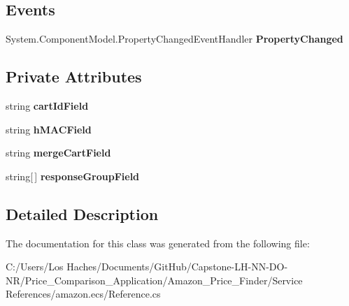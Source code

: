 \subsection*{Events}
\begin{DoxyCompactItemize}
\item 
\hypertarget{class_price___comparison_1_1amazon_1_1ecs_1_1_cart_clear_request_a8ccd384a0b7b5da722a6b6af9a76769d}{System.\-Component\-Model.\-Property\-Changed\-Event\-Handler {\bfseries Property\-Changed}}\label{class_price___comparison_1_1amazon_1_1ecs_1_1_cart_clear_request_a8ccd384a0b7b5da722a6b6af9a76769d}

\end{DoxyCompactItemize}
\subsection*{Private Attributes}
\begin{DoxyCompactItemize}
\item 
\hypertarget{class_price___comparison_1_1amazon_1_1ecs_1_1_cart_clear_request_a6cca7bbc7fdb17bf0630b02a17c46d0e}{string {\bfseries cart\-Id\-Field}}\label{class_price___comparison_1_1amazon_1_1ecs_1_1_cart_clear_request_a6cca7bbc7fdb17bf0630b02a17c46d0e}

\item 
\hypertarget{class_price___comparison_1_1amazon_1_1ecs_1_1_cart_clear_request_a2221df97dc1302f361955cd33f50a418}{string {\bfseries h\-M\-A\-C\-Field}}\label{class_price___comparison_1_1amazon_1_1ecs_1_1_cart_clear_request_a2221df97dc1302f361955cd33f50a418}

\item 
\hypertarget{class_price___comparison_1_1amazon_1_1ecs_1_1_cart_clear_request_aa51b51ce7e00940acfa16834db048952}{string {\bfseries merge\-Cart\-Field}}\label{class_price___comparison_1_1amazon_1_1ecs_1_1_cart_clear_request_aa51b51ce7e00940acfa16834db048952}

\item 
\hypertarget{class_price___comparison_1_1amazon_1_1ecs_1_1_cart_clear_request_aa4db9a69945bca2aa3376759f734f3d6}{string\mbox{[}$\,$\mbox{]} {\bfseries response\-Group\-Field}}\label{class_price___comparison_1_1amazon_1_1ecs_1_1_cart_clear_request_aa4db9a69945bca2aa3376759f734f3d6}

\end{DoxyCompactItemize}


\subsection{Detailed Description}


The documentation for this class was generated from the following file\-:\begin{DoxyCompactItemize}
\item 
C\-:/\-Users/\-Los Haches/\-Documents/\-Git\-Hub/\-Capstone-\/\-L\-H-\/\-N\-N-\/\-D\-O-\/\-N\-R/\-Price\-\_\-\-Comparison\-\_\-\-Application/\-Amazon\-\_\-\-Price\-\_\-\-Finder/\-Service References/amazon.\-ecs/Reference.\-cs\end{DoxyCompactItemize}
